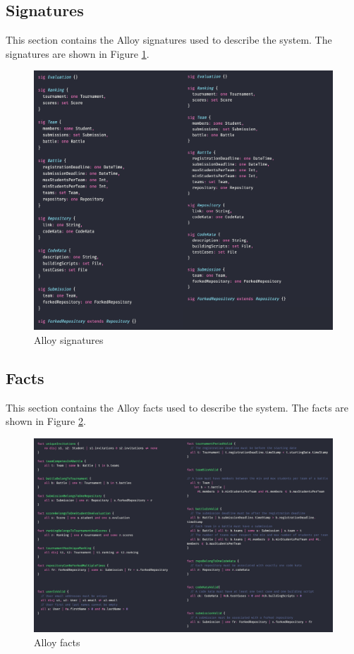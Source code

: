 \subsection{Signatures}
This section contains the Alloy signatures used to describe the system. The signatures are shown in Figure \ref{fig:alloy_signatures}.
\begin{figure}[H]
    \centering
    \includegraphics[width=1\textwidth]{Images/alloy_signatures.png}
    \caption{Alloy signatures}
    \label{fig:alloy_signatures}
\end{figure}
\newpage

\subsection{Facts}
This section contains the Alloy facts used to describe the system. The facts are shown in Figure \ref{fig:alloy_facts}.
\begin{figure}[H]
    \centering
    \includegraphics[width=1\textwidth]{Images/alloy_facts.png}
    \caption{Alloy facts}
    \label{fig:alloy_facts}
\end{figure}
\newpage


